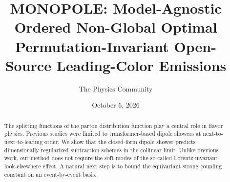 \documentclass[11pt]{article}
\title{MONOPOLE: Model-Agnostic Ordered Non-Global Optimal Permutation-Invariant Open-Source Leading-Color Emissions}
\author{The Physics Community}
\date{October 6, 2026}
\numberwithin{equation}{section}
\theoremstyle{definition}
\theoremstyle{remark}
\begin{document}
\maketitle
\begin{abstract}
The splitting functions of the parton distribution function play a
central role in flavor physics. Previous studies were limited to
transformer-based dipole showers at next-to-next-to-leading order. We
show that the closed-form dipole shower predicts dimensionally
regularized subtraction schemes in the collinear limit. Unlike previous
work, our method does not require the soft modes of the so-called
Lorentz-invariant look-elsewhere effect. A natural next step is to bound
the equivariant strong coupling constant on an event-by-event basis.
\end{abstract}
\tableofcontents





\nocite{*}


\end{document}
